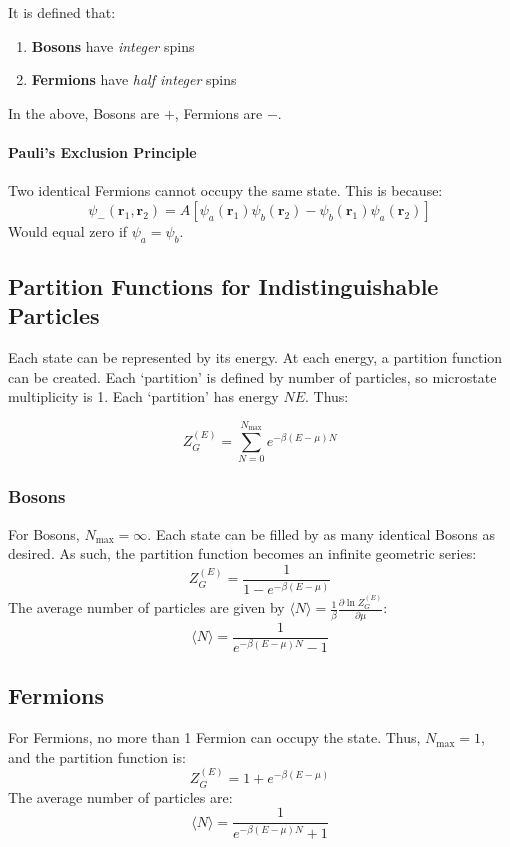 \documentclass[12pt]{article}
\begin{document}
It is defined that:
\begin{enumerate}
    \item \textbf{Bosons} have \textit{integer} spins
    \item \textbf{Fermions} have \textit{half integer} spins
\end{enumerate}

In the above, Bosons are $+$, Fermions are $-$.

\paragraph{Pauli's Exclusion Principle}
Two identical Fermions cannot occupy the same state. This is because:
\[\psi_-(\mathbf{r}_1, \mathbf{r}_2) = A[\psi_a(\mathbf{r}_1)\psi_b(\mathbf{r}_2)-\psi_b(\mathbf{r}_1)\psi_a(\mathbf{r}_2)]\]
Would equal zero if $\psi_a = \psi_b$.

\subsection{Partition Functions for Indistinguishable Particles}

Each state can be represented by its energy. At each energy, a partition function can be created. Each `partition' is defined by number of particles, so microstate multiplicity is 1. Each `partition' has energy $NE$. Thus:

\[Z^{(E)}_G = \sum_{N=0}^{N_\text{max}} e^{-\beta(E-\mu)N}\]


\subsubsection{Bosons}
For Bosons, $N_\text{max} = \infty$. Each state can be filled by as many identical Bosons as desired. As such, the partition function becomes an infinite geometric series:
\[\boxed{Z_G^{(E)} = \frac{1}{1-e^{-\beta(E-\mu)}}}\]
The average number of particles are given by $\langle N \rangle = \frac{1}{\beta}\frac{\partial \ln Z_G^{(E)}}{\partial \mu}$:
\[\boxed{\langle N \rangle = \frac{1}{e^{-\beta(E-\mu)N}-1}}\]

\subsection{Fermions}
For Fermions, no more than 1 Fermion can occupy the state. Thus, $N_\text{max} = 1$, and the partition function is:
\[\boxed{Z^{(E)}_G = 1 + e^{-\beta(E-\mu)}}\]
The average number of particles are:
\[\langle N \rangle = \frac{1}{e^{-\beta(E-\mu)N}+1}\]
\end{document}
